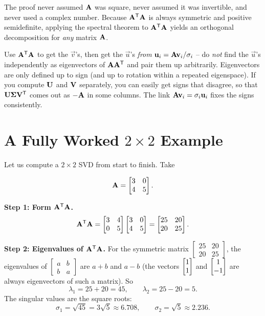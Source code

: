 \begin{aestheticbox}
The proof never assumed $\mathbf{A}$ was square, never assumed
it was invertible, and never used a complex number. Because $\mathbf{A}^{\mathsf{T}}\mathbf{A}$ is
always symmetric and positive semidefinite, applying the spectral theorem to
$\mathbf{A}^{\mathsf{T}}\mathbf{A}$ yields an orthogonal decomposition for \emph{any} matrix
$\mathbf{A}$.
\end{aestheticbox}

\begin{trapbox}
Use $\mathbf{A}^{\mathsf{T}}\mathbf{A}$ to get the $\vec{v}$'s, then get the $\vec{u}$'s
\emph{from} $\mathbf{u}_i = \mathbf{A}\mathbf{v}_i / \sigma_i$ -- do \emph{not} find the
$\vec{u}$'s independently as eigenvectors of $\mathbf{A}\mathbf{A}^{\mathsf{T}}$ and pair them up
arbitrarily. Eigenvectors are only defined up to sign (and up to rotation within
a repeated eigenspace). If you compute $\mathbf{U}$ and $\mathbf{V}$ separately, you
can easily get signs that disagree, so that $\mathbf{U}\mathbf{\Sigma}\mathbf{V}^{\mathsf{T}}$ comes
out as $-\mathbf{A}$ in some columns. The link $\mathbf{A}\mathbf{v}_i = \sigma_i\mathbf{u}_i$
fixes the signs consistently.
\end{trapbox}

\section{A Fully Worked $2 \times 2$ Example}
\label{ch29:worked-2x2}

Let us compute a $2\times 2$ SVD from start to finish. Take

\[
  \mathbf{A} = \begin{bmatrix} 3 & 0 \\ 4 & 5 \end{bmatrix}.
\]

\textbf{Step 1: Form $\mathbf{A}^{\mathsf{T}}\mathbf{A}$.}
\[
  \mathbf{A}^{\mathsf{T}}\mathbf{A}
  = \begin{bmatrix} 3 & 4 \\ 0 & 5 \end{bmatrix}
    \begin{bmatrix} 3 & 0 \\ 4 & 5 \end{bmatrix}
  = \begin{bmatrix} 25 & 20 \\ 20 & 25 \end{bmatrix}.
\]

\textbf{Step 2: Eigenvalues of $\mathbf{A}^{\mathsf{T}}\mathbf{A}$.} For the symmetric matrix
$\begin{bmatrix} 25 & 20 \\ 20 & 25\end{bmatrix}$, the eigenvalues of
$\begin{bmatrix} a & b \\ b & a\end{bmatrix}$ are $a+b$ and $a-b$ (the vectors
$\begin{bmatrix}1\\1\end{bmatrix}$ and $\begin{bmatrix}1\\-1\end{bmatrix}$ are always eigenvectors of such a matrix).
So
\[
  \lambda_1 = 25 + 20 = 45, \qquad \lambda_2 = 25 - 20 = 5.
\]
The singular values are the square roots:
\[
  \sigma_1 = \sqrt{45} = 3\sqrt{5} \approx 6.708, \qquad
  \sigma_2 = \sqrt{5} \approx 2.236.
\]

